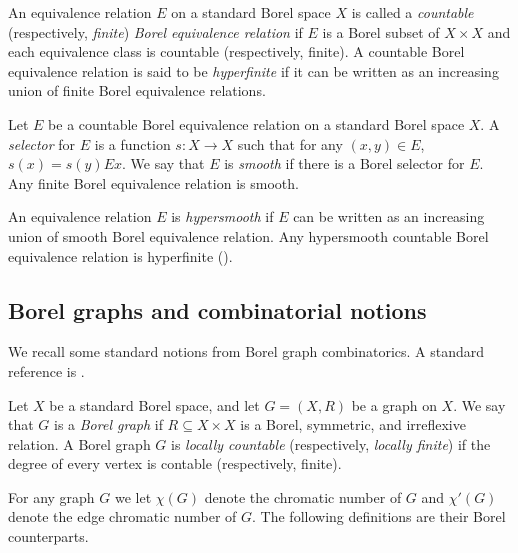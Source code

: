 \documentclass[11pt, reqno, a4paper]{amsart}
\newtheorem{lemma}[theorem]{Lemma}
\theoremstyle{definition}
\theoremstyle{plain}
\begin{document}




An equivalence relation $E$ on a standard Borel space $X$ is called a \emph{countable} (respectively, \emph{finite}) \emph{Borel equivalence relation} if $E$ is a Borel subset of $X\times X$ and each equivalence class is countable (respectively, finite). A countable Borel equivalence relation is said to be \emph{hyperfinite} if it can be written as an increasing union of finite Borel equivalence relations. 

Let $E$ be a countable Borel equivalence relation on a standard Borel space $X$. A \emph{selector} for $E$ is a function $s\colon X\to X$ such that for any $(x,y)\in E$, $s(x)=s(y)Ex$. We say that $E$ is \emph{smooth} if there is a Borel selector for $E$. Any finite Borel equivalence relation is smooth.

An equivalence relation $E$ is \emph{hypersmooth} if $E$ can be written as an increasing union of smooth Borel equivalence relation. Any hypersmooth countable Borel equivalence relation is hyperfinite (\cite[Theorem 5.1 (3)]{DoughertyJacksonKechris1994}).


\subsection{Borel graphs and combinatorial notions}
We recall some standard notions from Borel graph combinatorics. A standard reference is \cite{KechrisMarks2020}.

Let $X$ be a standard Borel space, and let $G=(X,R)$ be a graph on $X$.
We say that $G$ is a \emph{Borel graph} if $R\subseteq X\times X$ is a Borel, symmetric, and irreflexive relation. A Borel graph $G$ is \emph{locally countable} (respectively, \emph{locally finite}) if the degree of every vertex is contable (respectively, finite). 

For any graph $G$ we let $\chi(G)$ denote the chromatic number of $G$ and $\chi'(G)$ denote the edge chromatic number of $G$. The following definitions are their Borel counterparts.
\end{document}
